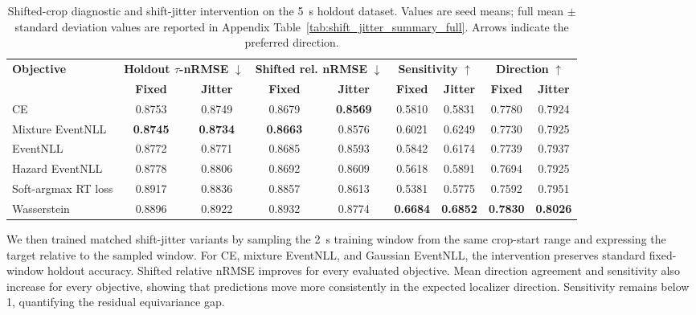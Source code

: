 \documentclass[12pt]{article}
\begin{document}
\begin{table}[!t]
\centering
\caption{Shifted-crop diagnostic and shift-jitter intervention on the 5~s holdout dataset. Values are seed means; full mean $\pm$ standard deviation values are reported in Appendix Table~\ref{tab:shift_jitter_summary_full}. Arrows indicate the preferred direction.}
\label{tab:shift_jitter_summary}
\footnotesize
\setlength{\tabcolsep}{3.5pt}
\renewcommand{\arraystretch}{1.12}
\begin{tabular}{@{} l c c c c c c c c @{}}
\toprule
\textbf{Objective} & \multicolumn{2}{c}{\textbf{Holdout \(\tau\)-nRMSE} $\downarrow$} & \multicolumn{2}{c}{\textbf{Shifted rel. nRMSE} $\downarrow$} & \multicolumn{2}{c}{\textbf{Sensitivity} $\uparrow$} & \multicolumn{2}{c}{\textbf{Direction} $\uparrow$} \\
\cmidrule(lr){2-3}\cmidrule(lr){4-5}\cmidrule(lr){6-7}\cmidrule(l){8-9}
 & \textbf{Fixed} & \textbf{Jitter} & \textbf{Fixed} & \textbf{Jitter} & \textbf{Fixed} & \textbf{Jitter} & \textbf{Fixed} & \textbf{Jitter} \\
\midrule
CE & 0.8753 & 0.8749 & 0.8679 & \textbf{0.8569} & 0.5810 & 0.5831 & 0.7780 & 0.7924 \\
Mixture EventNLL & \textbf{0.8745} & \textbf{0.8734} & \textbf{0.8663} & 0.8576 & 0.6021 & 0.6249 & 0.7730 & 0.7925 \\
EventNLL & 0.8772 & 0.8771 & 0.8685 & 0.8593 & 0.5842 & 0.6174 & 0.7739 & 0.7937 \\
Hazard EventNLL & 0.8778 & 0.8806 & 0.8692 & 0.8609 & 0.5618 & 0.5891 & 0.7694 & 0.7925 \\
Soft-argmax RT loss & 0.8917 & 0.8836 & 0.8857 & 0.8613 & 0.5381 & 0.5775 & 0.7592 & 0.7951 \\
Wasserstein & 0.8896 & 0.8922 & 0.8932 & 0.8774 & \textbf{0.6684} & \textbf{0.6852} & \textbf{0.7830} & \textbf{0.8026} \\
\bottomrule
\end{tabular}
\end{table}

We then trained matched shift-jitter variants by sampling the 2~s training window from the same crop-start range and expressing the target relative to the sampled window. For CE, mixture EventNLL, and Gaussian EventNLL, the intervention preserves standard fixed-window holdout accuracy. Shifted relative nRMSE improves for every evaluated objective. Mean direction agreement and sensitivity also increase for every objective, showing that predictions move more consistently in the expected localizer direction. Sensitivity remains below 1, quantifying the residual equivariance gap.
\end{document}
